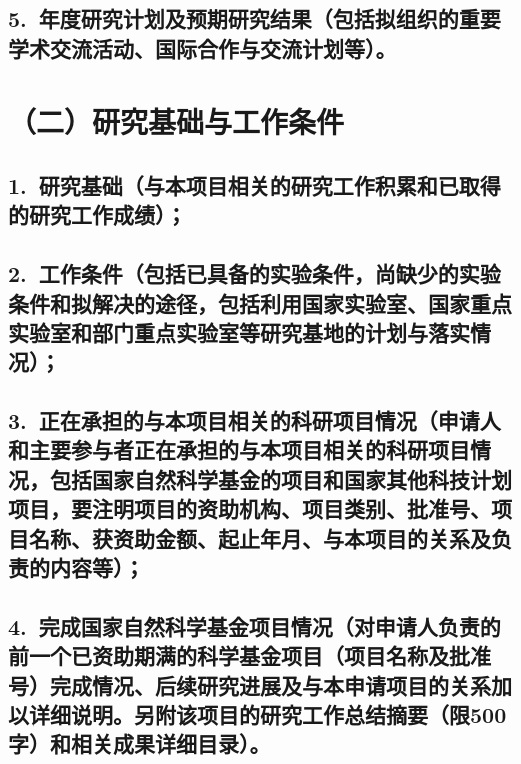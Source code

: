 \documentclass[12pt,UTF8,AutoFakeBold=3,a4paper]{ctexart} %
\begin{document}
{}


\subsection{\hspace{1.45em} 5.~{\bfseries 年度研究计划及预期研究结果}（包括拟组织的重要学术交流活动、国际合作与交流计划等）。}

{}




\section{{\bfseries（二）研究基础与工作条件}} %


\subsection{\hspace{1.45em} 1.~{\bfseries 研究基础}（与本项目相关的研究工作积累和已取得的研究工作成绩）；}


{}

\subsection{\hspace{1.45em} 2.~{\bfseries 工作条件}（包括已具备的实验条件，尚缺少的实验条件和拟解决的途径，包括利用国家实验室、国家重点实验室和部门重点实验室等研究基地的计划与落实情况）；}

{}

\subsection{\hspace{1.45em} 3.~{\bfseries 正在承担的与本项目相关的科研项目情况}（申请人和主要参与者正在承担的与本项目相关的科研项目情况，包括国家自然科学基金的项目和国家其他科技计划项目，要注明项目的资助机构、项目类别、批准号、项目名称、获资助金额、起止年月、与本项目的关系及负责的内容等）；} %

{}

\subsection{\hspace{1.45em} 4.~{\bfseries 完成国家自然科学基金项目情况}（对申请人负责的前一个已资助期满的科学基金项目（项目名称及批准号）完成情况、后续研究进展及与本申请项目的关系加以详细说明。另附该项目的研究工作总结摘要（限500字）和相关成果详细目录）。}
\end{document}
